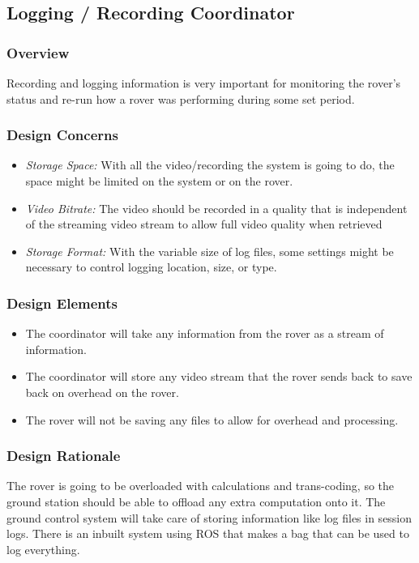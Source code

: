 \subsection{Logging / Recording Coordinator}
\subsubsection{Overview}
Recording and logging information is very important for monitoring the rover's status and re-run how a rover was performing during some set period.

\subsubsection{Design Concerns}
\begin{itemize}
\item \textit{Storage Space:} With all the video/recording the system is going to do, the space might be limited on the system or on the rover.
\item \textit{Video Bitrate:} The video should be recorded in a quality that is independent of the streaming video stream to allow full video quality when retrieved
\item \textit{Storage Format:} With the variable size of log files, some settings might be necessary to control logging location, size, or type. 
\end{itemize}

\subsubsection{Design Elements}
\begin{itemize}
\item The coordinator will take any information from the rover as a stream of information.
\item The coordinator will store any video stream that the rover sends back to save back on overhead on the rover.
\item The rover will not be saving any files to allow for overhead and processing.
\end{itemize}

\subsubsection{Design Rationale}
The rover is going to be overloaded with calculations and trans-coding, so the ground station should be able to offload any extra computation onto it.
The ground control system will take care of storing information like log files in session logs.
There is an inbuilt system using ROS that makes a bag that can be used to log everything.

